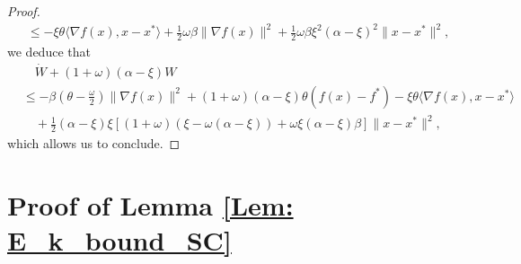 \documentclass[pdflatex,sn-mathphys-num]{sn-jnl}
\theoremstyle{thmstyleone}
\theoremstyle{thmstyletwo}
\theoremstyle{thmstylethree}
\begin{document}
\begin{appendices}
\begin{proof}
\begin{align*}
&\le - \xi\theta \langle\nabla f(x),x-x^* \rangle
   + \frac{1}{2}\omega\beta \| \nabla f(x) \|^2
   + \frac{1}{2}\omega\beta \xi^2(\alpha-\xi)^2 \| x-x^* \|^2, 
\end{align*}
we deduce that
\begin{align*}
&\quad \dot{W} + (1+\omega)(\alpha-\xi)W \\ 
&\le - \beta\left( \theta - \frac{\omega}{2} \right)\|\nabla f(x)\|^2 
  + (1+\omega)(\alpha-\xi)\theta (f(x)-f^*) 
  - \xi\theta \langle\nabla f(x),x-x^* \rangle\\
&\quad + \frac{1}{2}(\alpha-\xi)\xi[ (1+\omega)(\xi-\omega(\alpha-\xi)) + \omega\xi(\alpha-\xi)\beta ]\|x-x^*\|^2,
\end{align*}
which allows us to conclude. 
\end{proof}




\section{Proof of Lemma \ref{Lem: E_k_bound_SC}} \label{Proof: Lem: E_k_bound_SC}



\end{appendices}
\end{document}
